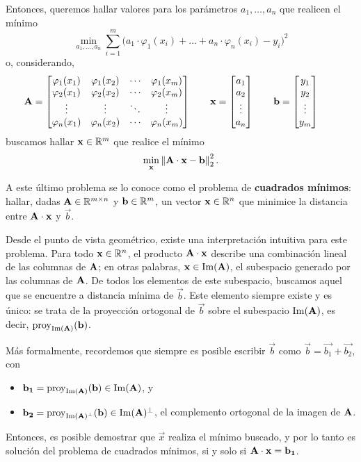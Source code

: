 Entonces, queremos hallar valores para los parámetros $a_1, \dots, a_n$ que
realicen el mínimo
\[ \min_{a_1,\dots,a_n} \sum_{i=1}^{m} \big( a_1 \cdot \varphi_1(x_i)
    + \dots + a_n \cdot \varphi_n(x_i) - y_i \big)^2 \]
o, considerando,
\[ \mathbf{A} = \begin{bmatrix}
    \varphi_1(x_1) & \varphi_1(x_2) & \cdots & \varphi_1(x_m) \\
    \varphi_2(x_1) & \varphi_2(x_2) & \cdots & \varphi_2(x_m) \\
    \vdots         & \vdots         & \ddots & \vdots \\
    \varphi_n(x_1) & \varphi_n(x_2) & \cdots & \varphi_n(x_m) 
\end{bmatrix} \qquad
\mathbf{x} = \begin{bmatrix}
    a_1 \\ a_2 \\ \vdots \\ a_n
\end{bmatrix} \qquad
\mathbf{b} = \begin{bmatrix}
    y_1 \\ y_2 \\ \vdots \\ y_m
\end{bmatrix} \qquad \]
buscamos hallar $\mathbf{x} \in \mathbb{R}^m$ que realice el mínimo
\[ \min_{\mathbf{x}} \left\Vert \mathbf{A} \cdot \mathbf{x} - \mathbf{b} \right\Vert_2^2. \]

A este último problema se lo conoce como el problema de \textbf{cuadrados
mínimos}: hallar, dadas $\mathbf{A} \in \mathbb{R}^{m \times n}$ y $\mathbf{b} \in \mathbb{R}^m$,
un vector $\mathbf{x} \in \mathbb{R}^n$ que minimice la distancia entre $\mathbf{A}
\cdot \mathbf{x}$ y $\vec{b}$.

Desde el punto de vista geométrico, existe una interpretación intuitiva para
este problema. Para todo $\mathbf{x} \in \mathbb{R}^n$, el producto $\mathbf{A}
\cdot \mathbf{x}$ describe una combinación lineal de las columnas de $\mathbf{A}$;
en otras palabras, $\mathbf{x} \in \operatorname{Im}(\mathbf{A})$, el subespacio generado por las
columnas de $\mathbf{A}$. De todos los elementos de este subespacio, buscamos
aquel que se encuentre a distancia mínima de $\vec{b}$. Este elemento siempre
existe y es único: se trata de la proyección ortogonal de $\vec{b}$ sobre el
subespacio $\operatorname{Im}(\mathbf{A})$, es decir, $\operatorname{proy}_{\operatorname{Im}(\mathbf{A})}(\mathbf{b})$.

Más formalmente, recordemos que siempre es posible escribir $\vec{b}$ como
$\vec{b} = \vec{b_1} + \vec{b_2}$, con
\begin{itemize}
\item $\mathbf{b_1} = \operatorname{proy}_{\operatorname{Im}(\mathbf{A})}(\mathbf{b}) \in \operatorname{Im}(\mathbf{A})$, y
\item $\mathbf{b_2} = \operatorname{proy}_{\operatorname{Im}(\mathbf{A})^{\bot}}(\mathbf{b}) \in
    \operatorname{Im}(\mathbf{A})^{\bot}$, el complemento ortogonal de la imagen de $\mathbf{A}$.
\end{itemize}
Entonces, es posible demostrar que $\vec{x}$ realiza el mínimo buscado,
y por lo tanto es solución del problema de cuadrados mínimos,
si y solo si $\mathbf{A} \cdot \mathbf{x} = \mathbf{b_1}$.

